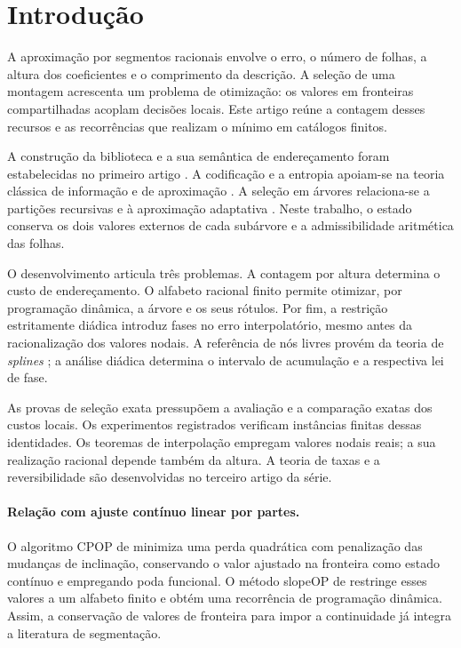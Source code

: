 \section{Introdução}
A aproximação por segmentos racionais envolve o erro, o número de folhas, a altura dos coeficientes e o comprimento da descrição. A seleção de uma montagem acrescenta um problema de otimização: os valores em fronteiras compartilhadas acoplam decisões locais. Este artigo reúne a contagem desses recursos e as recorrências que realizam o mínimo em catálogos finitos.

A construção da biblioteca e a sua semântica de endereçamento foram estabelecidas no primeiro artigo \citep{artigo_2-oliveiraI}. A codificação e a entropia apoiam-se na teoria clássica de informação e de aproximação \citep{artigo_1-kolmogorov1959,artigo_1-elias1975,artigo_1-cohen2001,artigo_1-cover2006}. A seleção em árvores relaciona-se a partições recursivas e à aproximação adaptativa \citep{artigo_2-breiman1984,artigo_2-donoho1997,artigo_2-blanchard2007,artigo_1-binev2004}. Neste trabalho, o estado conserva os dois valores externos de cada subárvore e a admissibilidade aritmética das folhas.

O desenvolvimento articula três problemas. A contagem por altura determina o custo de endereçamento. O alfabeto racional finito permite otimizar, por programação dinâmica, a árvore e os seus rótulos. Por fim, a restrição estritamente diádica introduz fases no erro interpolatório, mesmo antes da racionalização dos valores nodais. A referência de nós livres provém da teoria de \emph{splines} \citep{artigo_1-deboor1973,artigo_1-burchard1974}; a análise diádica determina o intervalo de acumulação e a respectiva lei de fase.

As provas de seleção exata pressupõem a avaliação e a comparação exatas dos custos locais. Os experimentos registrados verificam instâncias finitas dessas identidades. Os teoremas de interpolação empregam valores nodais reais; a sua realização racional depende também da altura. A teoria de taxas e a reversibilidade são desenvolvidas no terceiro artigo da série.

\paragraph{Relação com ajuste contínuo linear por partes.}
O algoritmo CPOP de \citet{artigo_2-fearnhead2019} minimiza uma perda quadrática com penalização das mudanças de inclinação, conservando o valor ajustado na fronteira como estado contínuo e empregando poda funcional. O método slopeOP de \citet{artigo_2-runge2022} restringe esses valores a um alfabeto finito e obtém uma recorrência de programação dinâmica. Assim, a conservação de valores de fronteira para impor a continuidade já integra a literatura de segmentação.

